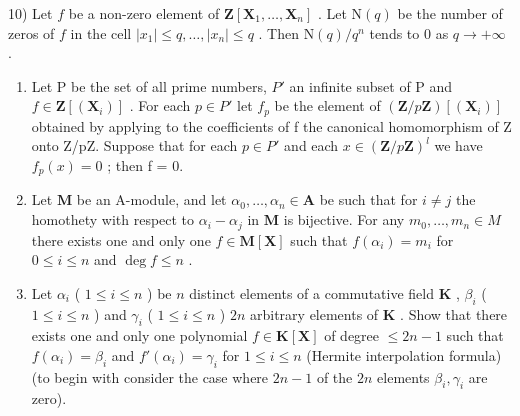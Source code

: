 10) Let \(f\) be a non-zero element of \(\mathbf{Z}[\mathbf{X}_1, \ldots, \mathbf{X}_n]\) . Let \(\mathrm{N}(q)\) be the number of zeros of \(f\) in the cell \(|x_1| \leqslant q, \ldots, |x_n| \leqslant q\) . Then \(\mathrm{N}(q) / q^n\) tends to 0 as \(q \to +\infty\) .

\begin{enumerate}
\def\labelenumi{\arabic{enumi})}
\setcounter{enumi}{10}
\item
  Let P be the set of all prime numbers, \(P'\) an infinite subset of P and \(f \in \mathbf{Z}[(\mathbf{X}_i)]\) . For each \(p \in P'\) let \(f_p\) be the element of \((\mathbf{Z}/p\mathbf{Z})[(\mathbf{X}_i)]\) obtained by applying to the coefficients of f the canonical homomorphism of Z onto Z/pZ. Suppose that for each \(p \in P'\) and each \(x \in (\mathbf{Z}/p\mathbf{Z})^l\) we have \(f_p(x) = 0\) ; then f = 0.
\item
  Let \(\mathbf{M}\) be an A-module, and let \(\alpha_0, \ldots, \alpha_n \in \mathbf{A}\) be such that for \(i \neq j\) the homothety with respect to \(\alpha_i - \alpha_j\) in \(\mathbf{M}\) is bijective. For any \(m_0, \ldots, m_n \in M\) there exists one and only one \(f \in \mathbf{M}[\mathbf{X}]\) such that \(f(\alpha_i) = m_i\) for \(0 \leqslant i \leqslant n\) and \(\deg f \leqslant n\) .
\item
  Let \(\alpha_{i}\) ( \(1 \leqslant i \leqslant n\) ) be \(n\) distinct elements of a commutative field \(\mathbf{K}\) , \(\beta_{i}\) ( \(1 \leqslant i \leqslant n\) ) and \(\gamma_{i}\) ( \(1 \leqslant i \leqslant n\) ) \(2n\) arbitrary elements of \(\mathbf{K}\) . Show that there exists one and only one polynomial \(f \in \mathbf{K}[\mathbf{X}]\) of degree \(\leqslant 2n - 1\) such that \(f(\alpha_{i}) = \beta_{i}\) and \(f'(\alpha_{i}) = \gamma_{i}\) for \(1 \leqslant i \leqslant n\) (Hermite interpolation formula) (to begin with consider the case where \(2n - 1\) of the \(2n\) elements \(\beta_{i}, \gamma_{i}\) are zero).
\end{enumerate}

